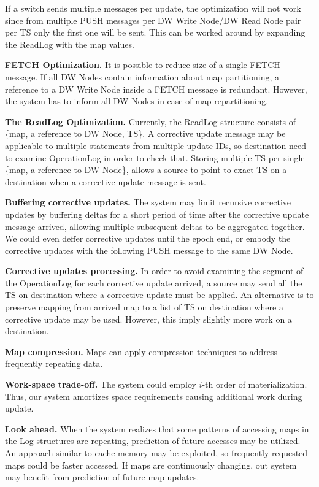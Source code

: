 \documentclass{sig-semester}
\begin{document}
If a switch sends multiple messages per update, the optimization will not work since from multiple PUSH messages per DW Write Node/DW Read Node pair per TS only the first one will be sent. This can be worked around by expanding the ReadLog with the map values. 

\textbf{FETCH Optimization.} It is possible to reduce size of a single FETCH message. If all DW Nodes contain information about map partitioning, a reference to a DW Write Node inside a FETCH message is redundant. However, the system has to inform all DW Nodes in case of map repartitioning.

\textbf{The ReadLog Optimization.} Currently, the ReadLog structure consists of \{map, a reference to DW Node, TS\}. A corrective update message may be applicable to multiple statements from multiple update IDs, so destination need to examine OperationLog in order to check that. Storing multiple TS per single \{map, a reference to DW Node\}, allows a source to point to exact TS on a destination when a corrective update message is sent.

\textbf{Buffering corrective updates.} The system may limit recursive corrective updates by buffering deltas for a short period of time after the corrective update message arrived, allowing multiple subsequent deltas to be aggregated together. We could even deffer corrective updates until the epoch end, or embody the corrective updates with the following PUSH message to the same DW Node.

\textbf{Corrective updates processing.} In order to avoid examining the segment of the OperationLog for each corrective update arrived, a source may send all the TS on destination where a corrective update must be applied. An alternative is to preserve mapping from arrived map to a list of TS on destination where a corrective update may be used. However, this imply slightly more work on a destination.

\textbf{Map compression.} Maps can apply compression techniques to address frequently repeating data.

\textbf{Work-space trade-off. } The system could employ $i$-th order of materialization. Thus, our system amortizes space requirements causing additional work during update.

\textbf{Look ahead.} When the system realizes that some patterns of accessing maps in the Log structures are repeating, prediction of future accesses may be utilized. An approach similar to cache memory may be exploited, so frequently requested maps could be faster accessed. If maps are continuously changing, out system may benefit from prediction of future map updates.
\end{document}
